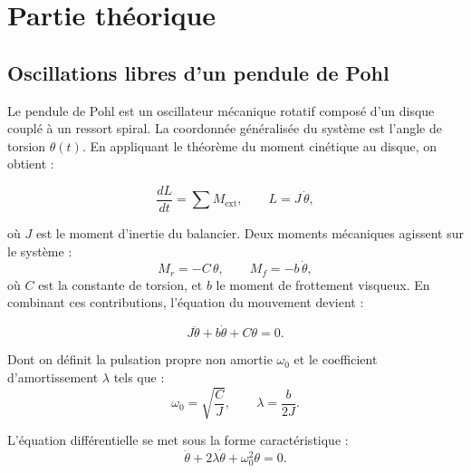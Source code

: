 \section{Partie théorique} \label{sec:theorie}

\subsection{Oscillations libres d’un pendule de Pohl} \label{subsec:osc_libres}

Le pendule de Pohl est un oscillateur mécanique rotatif composé d'un disque couplé à un ressort
spiral. La coordonnée généralisée du système est l’angle de torsion $\theta(t)$.
En appliquant le théorème du moment cinétique au disque, on obtient :

\begin{equation}
\frac{dL}{dt} = \sum M_{\mathrm{ext}},
\qquad L = J\,\dot{\theta},
\label{eq:TMC}
\end{equation}

où $J$ est le moment d’inertie du balancier. Deux moments mécaniques agissent sur le système :
\begin{equation}
M_r = -C\,\theta,
\qquad
M_f = -b\,\dot{\theta},
\label{eq:MOMENTS}
\end{equation}
où $C$ est la constante de torsion, et $b$ le moment de frottement visqueux.  
En combinant ces contributions, l'équation du mouvement devient :

\begin{equation}
J\ddot{\theta} + b\dot{\theta} + C\theta = 0.
\label{eq:edo}
\end{equation}

Dont on définit la pulsation propre non amortie $\omega_0$ et le coefficient d'amortissement $\lambda$ tels que :
\begin{equation}
\omega_0 = \sqrt{\frac{C}{J}},
\qquad
\lambda = \frac{b}{2J}.
\label{eq:lambda} %
\end{equation}

L’équation différentielle se met sous la forme caractéristique :
\begin{equation}
\ddot{\theta} + 2\lambda \dot{\theta} + \omega_0^2 \theta = 0.
\label{eq:cara}
\end{equation}



